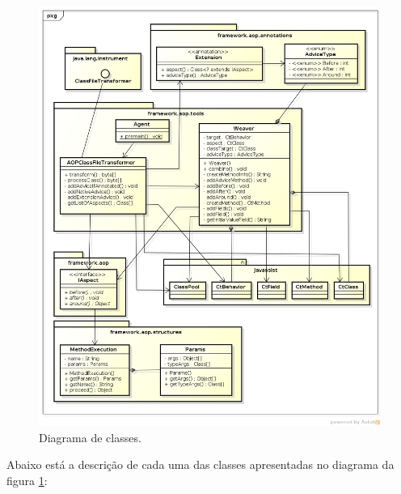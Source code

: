 \documentclass[tc,oneside]{iiufrgs}
\begin{document}
\begin{figure}[ht]
	\centering
	\includegraphics[scale=0.4]{diagramas/Framework_AOP.png}
	\caption{Diagrama de classes.}
	\label{fig:diagramaClassesAOP}
\end{figure}

Abaixo está a descrição de cada uma das classes apresentadas no diagrama da figura \ref{fig:diagramaClassesAOP}:
\end{document}
